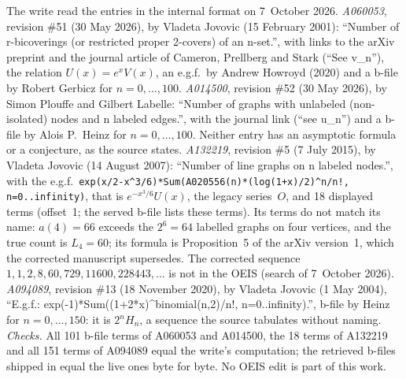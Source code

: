 \begin{remark}\label{tcl:rem:oeis}
The write read the entries in the internal format on 7~October 2026.
\emph{A060053}, revision \#51 (30 May 2026), by Vladeta Jovovic (15 February
2001): ``Number of r-bicoverings (or restricted proper 2-covers) of an
n-set.'', with links to the arXiv preprint and the journal article of Cameron,
Prellberg and Stark (``See v\_n''), the relation $U(x)=e^xV(x)$, an e.g.f.\ by Andrew Howroyd (2020) and a
b-file by Robert Gerbicz for $n=0,\ldots,100$. \emph{A014500}, revision \#52
(30 May 2026), by Simon Plouffe and Gilbert Labelle: ``Number of graphs with
unlabeled (non-isolated) nodes and n labeled edges.'', with the journal link
(``see u\_n'') and a b-file by Alois P.\ Heinz for $n=0,\ldots,100$. Neither
entry has an asymptotic formula or a conjecture, as the source states.
\emph{A132219}, revision \#5 (7 July 2015), by Vladeta Jovovic (14 August
2007): ``Number of line graphs on n labeled nodes.'', with the e.g.f.\
\verb|exp(x/2-x^3/6)*Sum(A020556(n)*(log(1+x)/2)^n/n!, n=0..infinity)|, that
is $e^{-x^3/6}U(x)$, the legacy series~$O$, and 18 displayed terms (offset~1;
the served b-file lists these terms). Its terms do not match its name: $a(4)=66$ exceeds
the $2^6=64$ labelled graphs on four vertices, and the true count is
$L_4=60$; its formula is Proposition~5 of the arXiv version~1, which the
corrected manuscript supersedes. The corrected sequence
$1,1,2,8,60,729,11600,228443,\ldots$ is not in the OEIS (search of
7~October 2026). \emph{A094089}, revision \#13 (18 November 2020), by Vladeta
Jovovic (1 May 2004), ``E.g.f.: exp(-1)*Sum((1+2*x)\^{}binomial(n,2)/n!,
n=0..infinity).'', b-file by Heinz for $n=0,\ldots,150$: it is $2^nH_n$, a
sequence the source tabulates without naming. \emph{Checks.} All 101 b-file
terms of A060053 and A014500, the 18 terms of A132219 and all 151 terms of
A094089 equal the write's computation; the retrieved b-files shipped in
\file{data/} equal the live ones byte for byte. No OEIS edit is part of this
work.
\end{remark}

